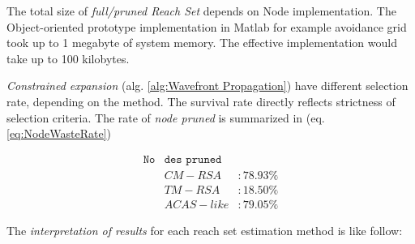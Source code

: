 \begin{note}
    The total size of \emph{full/pruned Reach Set} depends on Node implementation. The Object-oriented prototype implementation in Matlab for example avoidance grid took up to 1 megabyte of system memory. The effective implementation would take up to 100 kilobytes.
\end{note}

\emph{Constrained expansion} (alg. \ref{alg:Wavefront Propagation}) have different selection rate, depending on the method. The survival rate directly reflects strictness of selection criteria. The rate of \emph{node pruned} is summarized in (eq.\ref{eq:NodeWasteRate})  

\begin{equation}\label{eq:NodeWasteRate}
    \begin{aligned}
        \texttt{No} & \texttt{des } \texttt{pruned}\\
        &CM-RSA   &: 78.93 \%\\
        &TM-RSA  &: 18.50 \%\\
        &ACAS-like &: 79.05 \%
    \end{aligned}
\end{equation}

\noindent The \emph{interpretation of results} for each reach set estimation method is like follow: 

